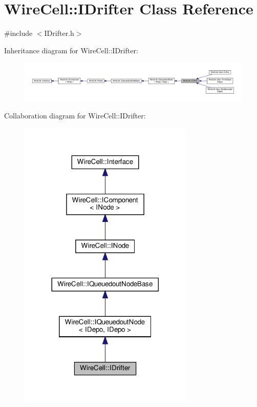 \hypertarget{class_wire_cell_1_1_i_drifter}{}\section{Wire\+Cell\+:\+:I\+Drifter Class Reference}
\label{class_wire_cell_1_1_i_drifter}


{\ttfamily \#include $<$I\+Drifter.\+h$>$}



Inheritance diagram for Wire\+Cell\+:\+:I\+Drifter\+:
\nopagebreak
\begin{figure}[H]
\begin{center}
\leavevmode
\includegraphics[width=350pt]{class_wire_cell_1_1_i_drifter__inherit__graph}
\end{center}
\end{figure}


Collaboration diagram for Wire\+Cell\+:\+:I\+Drifter\+:
\nopagebreak
\begin{figure}[H]
\begin{center}
\leavevmode
\includegraphics[width=236pt]{class_wire_cell_1_1_i_drifter__coll__graph}
\end{center}
\end{figure}
